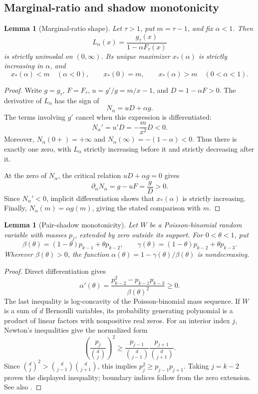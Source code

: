 \documentclass[11pt]{article}
\newtheorem{lemma}[theorem]{Lemma}
\theoremstyle{definition}
\theoremstyle{remark}
\newcommand{\1}{\mathbf 1}
\begin{document}
\subsection{Marginal-ratio and shadow monotonicity}

\begin{lemma}[Marginal-ratio shape]
\label{lem:general-marginal-ratio-shape}
Let \(\tau>1\), put \(m=\tau-1\), and fix \(\alpha<1\).  Then
\[
  L_\alpha(x)=\frac{g_\tau(x)}{1-\alpha F_\tau(x)}
\]
is strictly unimodal on \((0,\infty)\).  Its unique maximizer \(x_*(\alpha)\) is strictly increasing in \(\alpha\), and
\[
  x_*(\alpha)<m\quad(\alpha<0),\qquad
  x_*(0)=m,\qquad
  x_*(\alpha)>m\quad(0<\alpha<1).
\]
\end{lemma}

\begin{proof}
Write \(g=g_\tau\), \(F=F_\tau\), \(u=g'/g=m/x-1\), and \(D=1-\alpha F>0\).  The derivative of \(L_\alpha\) has the sign of
\[
  N_\alpha=uD+\alpha g.
\]
The terms involving \(g'\) cancel when this expression is differentiated:
\[
  N_\alpha'=u'D=-\frac m{x^2}D<0.
\]
Moreover, \(N_\alpha(0+)=+\infty\) and
\(N_\alpha(\infty)=-(1-\alpha)<0\).  Thus there is exactly one zero, with \(L_\alpha\) strictly increasing before it and strictly decreasing after it.

At the zero of \(N_\alpha\), the critical relation
\(uD+\alpha g=0\) gives
\[
  \partial_\alpha N_\alpha=g-uF=\frac gD>0.
\]
Since \(N_\alpha'<0\), implicit differentiation shows that \(x_*(\alpha)\) is strictly increasing.  Finally, \(N_\alpha(m)=\alpha g(m)\), giving the stated comparison with \(m\).
\end{proof}

\begin{lemma}[Pair-shadow monotonicity]
\label{lem:pair-shadow-monotonicity}
Let \(W\) be a Poisson-binomial random variable with masses \(p_j\), extended by zero outside its support.  For \(0<\theta<1\), put
\[
  \beta(\theta)=(1-\theta)p_{k-1}+\theta p_{k-2},
  \qquad
  \gamma(\theta)=(1-\theta)p_{k-2}+\theta p_{k-3}.
\]
Wherever \(\beta(\theta)>0\), the function
\(\alpha(\theta)=1-\gamma(\theta)/\beta(\theta)\)
is nondecreasing.
\end{lemma}

\begin{proof}
Direct differentiation gives
\[
  \alpha'(\theta)
  =\frac{p_{k-2}^2-p_{k-1}p_{k-3}}{\beta(\theta)^2}\ge0.
\]
The last inequality is log-concavity of the Poisson-binomial mass
sequence.  If \(W\) is a sum of \(d\) Bernoulli variables, its
probability generating polynomial is a product of linear factors with
nonpositive real zeros.  For an interior index \(j\), Newton's
inequalities give the normalized form
\[
 \left(\frac{p_j}{\binom dj}\right)^2
 \ge
 \frac{p_{j-1}}{\binom d{j-1}}
 \frac{p_{j+1}}{\binom d{j+1}}.
\]
Since \(\binom dj^2>\binom d{j-1}\binom d{j+1}\), this implies
\(p_j^2\ge p_{j-1}p_{j+1}\).  Taking \(j=k-2\) proves the displayed
inequality; boundary indices follow from the zero extension.  See also
\cite{Liggett1997}.
\end{proof}
\end{document}

